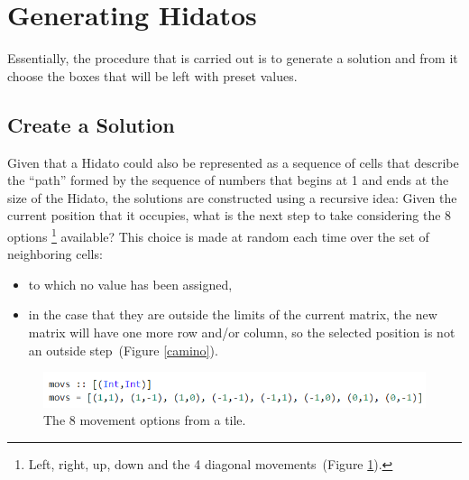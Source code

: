 \documentclass{llncs}
\begin{document}

\section{Generating Hidatos}
Essentially, the procedure that is carried out is to generate a solution and from it choose the boxes that will be left with preset values.

\subsection{Create a Solution}
Given that a Hidato could also be represented as a sequence of cells that describe the ``path'' formed by the sequence of numbers that begins at 1 and ends at the size of the Hidato, the solutions are constructed using a recursive idea: Given the current position that it occupies, what is the next step to take considering the 8 options \footnote{Left, right, up, down and the 4 diagonal movements~(Figure \ref{movs}).} available?
This choice is made at random each time over the set of neighboring cells:
\begin{itemize}
\item to which no value has been assigned,
\item in the case that they are outside the limits of the current matrix, the new matrix will have one more row and/or column, so the selected position is not an outside step~(Figure \ref{camino}).
\end{itemize}


\begin{figure}
\begin{center}
\includegraphics[width= 1\columnwidth]{figuras/movs}
\end{center}
\caption{The 8 movement options from a tile.}
\label{movs}
\end{figure}
\end{document}
